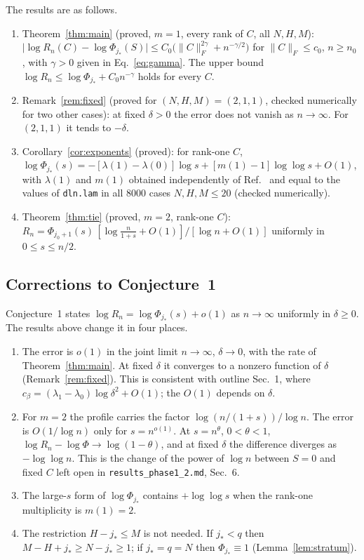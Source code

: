 \documentclass[11pt]{article}
\theoremstyle{remark}
\begin{document}
The results are as follows.
\begin{enumerate}
\item Theorem~\ref{thm:main} (proved, $m=1$, every rank of $C$, all $N,H,M$): $\lvert\log R_n(C)-\log\Phi_{j_*}(S)\rvert\le C_0\big(\lVert C\rVert_F^{2\gamma}+n^{-\gamma/2}\big)$ for $\lVert C\rVert_F\le c_0$, $n\ge n_0$, with $\gamma>0$ given in Eq.~\eqref{eq:gamma}. The upper bound $\log R_n\le\log\Phi_{j_*}+C_0n^{-\gamma}$ holds for every $C$.
\item Remark~\ref{rem:fixed} (proved for $(N,H,M)=(2,1,1)$, checked numerically for two other cases): at fixed $\delta>0$ the error does not vanish as $n\to\infty$. For $(2,1,1)$ it tends to $-\delta$.
\item Corollary~\ref{cor:exponents} (proved): for rank-one $C$, $\log\Phi_{j_*}(s)=-[\lambda(1)-\lambda(0)]\log s+[m(1)-1]\log\log s+O(1)$, with $\lambda(1)$ and $m(1)$ obtained independently of Ref.~\cite{AW05} and equal to the values of \texttt{dln.lam} in all $8000$ cases $N,H,M\le20$ (checked numerically).
\item Theorem~\ref{thm:tie} (proved, $m=2$, rank-one $C$): $R_n=\Phi_{j_0+1}(s)\,[\log\tfrac n{1+s}+O(1)]/[\log n+O(1)]$ uniformly in $0\le s\le n/2$.
\end{enumerate}

\subsection{Corrections to Conjecture~1}\label{sec:corrections}

Conjecture~1 states $\log R_n=\log\Phi_{j_*}(s)+o(1)$ as $n\to\infty$ uniformly in $\delta\ge0$.
The results above change it in four places.
\begin{enumerate}
\item The error is $o(1)$ in the joint limit $n\to\infty$, $\delta\to0$, with the rate of Theorem~\ref{thm:main}. At fixed $\delta$ it converges to a nonzero function of $\delta$ (Remark~\ref{rem:fixed}). This is consistent with outline Sec.~1, where $c_\beta=(\lambda_1-\lambda_0)\log\delta^2+O(1)$; the $O(1)$ depends on $\delta$.
\item For $m=2$ the profile carries the factor $\log(n/(1+s))/\log n$. The error is $O(1/\log n)$ only for $s=n^{o(1)}$. At $s=n^\theta$, $0<\theta<1$, $\log R_n-\log\Phi\to\log(1-\theta)$, and at fixed $\delta$ the difference diverges as $-\log\log n$. This is the change of the power of $\log n$ between $S=0$ and fixed $C$ left open in \texttt{results\_phase1\_2.md}, Sec.~6.
\item The large-$s$ form of $\log\Phi_{j_*}$ contains $+\log\log s$ when the rank-one multiplicity is $m(1)=2$.
\item The restriction $H-j_*\le M$ is not needed. If $j_*<q$ then $M-H+j_*\ge N-j_*\ge1$; if $j_*=q=N$ then $\Phi_{j_*}\equiv1$ (Lemma~\ref{lem:stratum}).
\end{enumerate}
\end{document}
